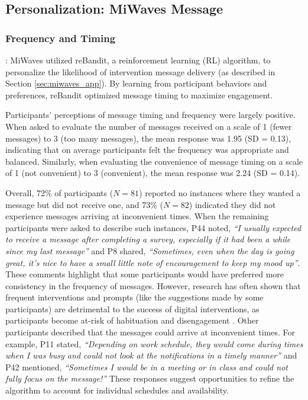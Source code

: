 \subsection{Personalization: MiWaves Message}
\subsubsection{Frequency and Timing}: MiWaves utilized reBandit, a reinforcement learning (RL) algorithm, to personalize the likelihood of intervention message delivery (as described in Section \ref{sec:miwaves_app}). By learning from participant behaviors and preferences, reBandit optimized message timing to maximize engagement.

Participants' perceptions of message timing and frequency were largely positive. When asked to evaluate the number of messages received on a scale of 1 (fewer messages) to 3 (too many messages), the mean response was 1.95 (SD = 0.13), indicating that on average participants felt the frequency was appropriate and balanced. Similarly, when evaluating the convenience of message timing on a scale of 1 (not convenient) to 3 (convenient), the mean response was 2.24 (SD = 0.14). 

Overall, 72\% of participants ($N=81$) reported no instances where they wanted a message but did not receive one, and 73\% ($N=82$) indicated they did not experience messages arriving at inconvenient times. When the remaining participants were asked to describe such instances, 
P44 noted, \emph{``I usually expected to receive a message after completing a survey, especially if it had been a while since my last message''} and P8 shared, \emph{``Sometimes, even when the day is going great, it's nice to have a small little note of encouragement to keep my mood up''}. These comments highlight that some participants would have preferred more consistency in the frequency of messages. However, research has often shown that frequent interventions and prompts (like the suggestions made by some participants) are detrimental to the success of digital interventions, as participants become at-risk of habituation and disengagement \cite{alkhaldi2016effectiveness}. Other participants described that the messages could arrive at inconvenient times. For example, P11 stated, \emph{``Depending on work schedule, they would come during times when I was busy and could not look at the notifications in a timely manner''} and P42 mentioned, \emph{``Sometimes I would be in a meeting or in class and could not fully focus on the message!''} These responses suggest opportunities to refine the algorithm to account for individual schedules and availability.

